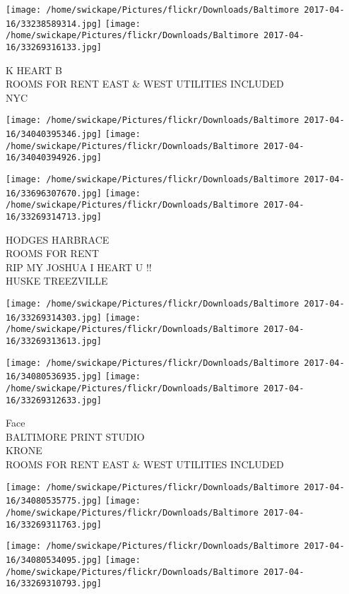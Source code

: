 \documentclass[10pt,letterpaper]{article}
\begin{document}
\vspace{0.25in}
\texttt{[image: /home/swickape/Pictures/flickr/Downloads/Baltimore 2017-04-16/33238589314.jpg]}
\texttt{[image: /home/swickape/Pictures/flickr/Downloads/Baltimore 2017-04-16/33269316133.jpg]}

K HEART B\\
ROOMS FOR RENT EAST \& WEST UTILITIES INCLUDED\\
NYC\\
\pagebreak

\texttt{[image: /home/swickape/Pictures/flickr/Downloads/Baltimore 2017-04-16/34040395346.jpg]}
\texttt{[image: /home/swickape/Pictures/flickr/Downloads/Baltimore 2017-04-16/34040394926.jpg]}

\texttt{[image: /home/swickape/Pictures/flickr/Downloads/Baltimore 2017-04-16/33696307670.jpg]}
\texttt{[image: /home/swickape/Pictures/flickr/Downloads/Baltimore 2017-04-16/33269314713.jpg]}

HODGES HARBRACE\\
ROOMS FOR RENT\\
RIP MY JOSHUA I HEART U !!\\
HUSKE TREEZVILLE\\
\pagebreak

\texttt{[image: /home/swickape/Pictures/flickr/Downloads/Baltimore 2017-04-16/33269314303.jpg]}
\texttt{[image: /home/swickape/Pictures/flickr/Downloads/Baltimore 2017-04-16/33269313613.jpg]}

\texttt{[image: /home/swickape/Pictures/flickr/Downloads/Baltimore 2017-04-16/34080536935.jpg]}
\texttt{[image: /home/swickape/Pictures/flickr/Downloads/Baltimore 2017-04-16/33269312633.jpg]}

Face\\
BALTIMORE PRINT STUDIO\\
KRONE\\
ROOMS FOR RENT EAST \& WEST UTILITIES INCLUDED\\
\pagebreak

\texttt{[image: /home/swickape/Pictures/flickr/Downloads/Baltimore 2017-04-16/34080535775.jpg]}
\texttt{[image: /home/swickape/Pictures/flickr/Downloads/Baltimore 2017-04-16/33269311763.jpg]}

\texttt{[image: /home/swickape/Pictures/flickr/Downloads/Baltimore 2017-04-16/34080534095.jpg]}
\texttt{[image: /home/swickape/Pictures/flickr/Downloads/Baltimore 2017-04-16/33269310793.jpg]}
\end{document}
